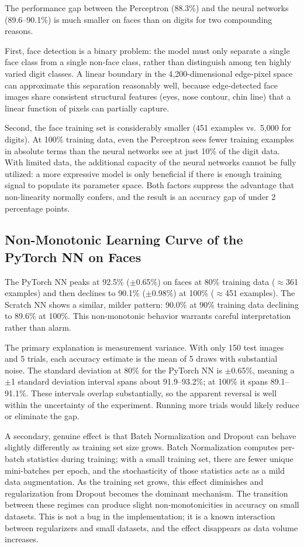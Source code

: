 \documentclass[12pt]{article}
\begin{document}
The performance gap between the Perceptron (88.3\%) and the neural networks (89.6--90.1\%)
is much smaller on faces than on digits for two compounding reasons.

First, face detection is a binary problem: the model must only separate a single face
class from a single non-face class, rather than distinguish among ten highly varied digit
classes. A linear boundary in the 4{,}200-dimensional edge-pixel space can approximate
this separation reasonably well, because edge-detected face images share consistent
structural features (eyes, nose contour, chin line) that a linear function of pixels can
partially capture.

Second, the face training set is considerably smaller (451 examples vs.\ 5{,}000 for
digits). At 100\% training data, even the Perceptron sees fewer training examples in
absolute terms than the neural networks see at just 10\% of the digit data. With limited
data, the additional capacity of the neural networks cannot be fully utilized: a more
expressive model is only beneficial if there is enough training signal to populate its
parameter space. Both factors suppress the advantage that non-linearity normally confers,
and the result is an accuracy gap of under 2 percentage points.

\subsection{Non-Monotonic Learning Curve of the PyTorch NN on Faces}
\label{sec:nonmonotonic}

The PyTorch NN peaks at 92.5\% ($\pm$0.65\%) on faces at 80\% training data
($\approx$361 examples) and then declines to 90.1\% ($\pm$0.98\%) at 100\%
($\approx$451 examples). The Scratch NN shows a similar, milder pattern: 90.0\% at
90\% training data declining to 89.6\% at 100\%. This non-monotonic behavior warrants
careful interpretation rather than alarm.

The primary explanation is measurement variance. With only 150 test images and 5 trials,
each accuracy estimate is the mean of 5 draws with substantial noise. The standard
deviation at 80\% for the PyTorch NN is $\pm$0.65\%, meaning a $\pm$1 standard deviation
interval spans about 91.9--93.2\%; at 100\% it spans 89.1--91.1\%. These intervals
overlap substantially, so the apparent reversal is well within the uncertainty of the
experiment. Running more trials would likely reduce or eliminate the gap.

A secondary, genuine effect is that Batch Normalization and Dropout can behave slightly
differently as training set size grows. Batch Normalization computes per-batch statistics
during training; with a small training set, there are fewer unique mini-batches per epoch,
and the stochasticity of those statistics acts as a mild data augmentation. As the
training set grows, this effect diminishes and regularization from Dropout becomes the
dominant mechanism. The transition between these regimes can produce slight non-monotonicities
in accuracy on small datasets. This is not a bug in the implementation; it is a known
interaction between regularizers and small datasets, and the effect disappears as data
volume increases.
\end{document}
